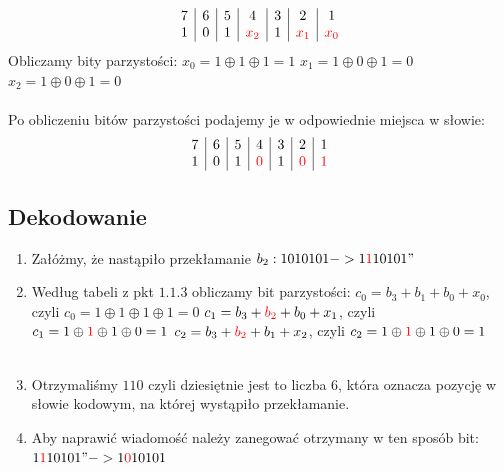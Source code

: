 \documentclass[a4paper,11pt]{article}
\begin{document}
\begin{enumerate}
				\begin{displaymath}
				\begin{array}{c|c|c|c|c|c|c}
				7 & 6 & 5 & 4 & 3 & 2 & 1 \\
				1 & 0 & 1 & \color{red}x_{2} & 1 &\color{red} x_{1}& \color{red}x_{0} \\
				\end{array}
				\end{displaymath}
				Obliczamy bity parzystości: 
					\subitem $x_{0} = 1 \oplus 1 \oplus 1 = 1$
					\subitem $x_{1} = 1 \oplus 0 \oplus 1 = 0$
					\subitem $x_{2} = 1 \oplus 0 \oplus 1 = 0$ \\ \\
				Po obliczeniu bitów parzystości podajemy je w odpowiednie miejsca w słowie:
				\begin{displaymath}
				\begin{array}{c|c|c|c|c|c|c}
				7 & 6 & 5 & 4 & 3 & 2 & 1 \\
				1 & 0 & 1 & \color{red}0 & 1 &\color{red}0& \color{red}1\\
				\end{array}
				\end{displaymath}			
		\end{enumerate}
		\subsection{Dekodowanie}
			\begin{enumerate}
				\item Załóżmy, że nastąpiło przekłamanie $b_{2}: 1010101 -> 1\color{red}1\color{black}10101"$
				\item Według tabeli z pkt $1.1.3$ obliczamy bit parzystości:
					\subitem $c_{0} = b_{3} + b_{1} + b_{0} + x_{0}$, czyli $c_{0} = 1 \oplus 1 \oplus 1 \oplus 1 = 0 $
					\subitem $c_{1} = b_{3} + \color{red}b_{2}\color{black} + b_{0} + x_{1}$, czyli $c_{1} = 1 \oplus \color{red}1\color{black} \oplus 1 \oplus 0 = 1 $
					\subitem $c_{2} = b_{3} + \color{red}b_{2}\color{black} + b_{1} + x_{2}$, czyli $c_{2} = 1 \oplus \color{red}1\color{black} \oplus 1 \oplus 0 = 1 $\\ \\
				\item Otrzymaliśmy $110$ czyli dziesiętnie jest to liczba $6$, która oznacza pozycję w słowie kodowym, na której wystąpiło przekłamanie.  
				\item Aby naprawić wiadomość należy zanegować otrzymany w ten sposób bit: $1\color{red}1\color{black}10101" -> 1\color{red}0\color{black}10101$
			\end{enumerate}
\end{document}
